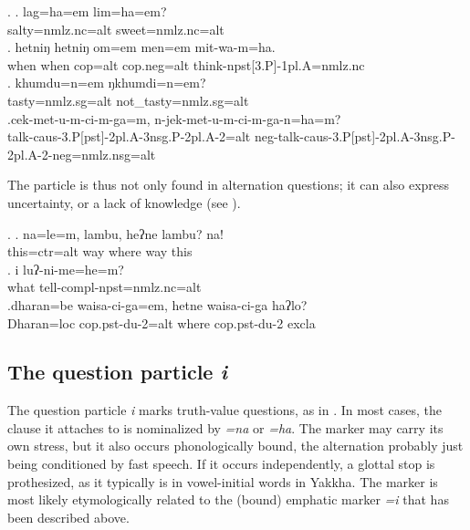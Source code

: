 \ex. \ag. lag=ha=em lim=ha=em?\\
salty{\sc =nmlz.nc=alt} sweet{\sc =nmlz.nc=alt}\\
\bg. hetniŋ hetniŋ om=em men=em  mit-wa-m=ha.\\
when when	{\sc cop=alt} {\sc cop.neg=alt} think{\sc -npst[3.P]-1pl.A=nmlz.nc}\\
	\bg.   khumdu=n=em           ŋkhumdi=n=em?\\
tasty{\sc =nmlz.sg=alt} not\_tasty{\sc =nmlz.sg=alt}	\\
	 
	\bg.cek-met-u-m-ci-m-ga=m,                                    n-jek-met-u-m-ci-m-ga-n=ha=m?\\
talk{\sc -caus-3.P[pst]-2pl.A-3nsg.P-2pl.A-2=alt}	{\sc neg-}talk{\sc -caus-3.P[pst]-2pl.A-3nsg.P-2pl.A-2-neg=nmlz.nsg=alt}	\\
	 
 
 The  particle is thus not only found in alternation questions; it can also express uncertainty, or a lack of knowledge  (see \Next).
 
 \ex. \ag. na=le=m,              lambu, heʔne lambu? na!\\
 this{\sc =ctr=alt} way where way this\\
 \bg.  i    luʔ-ni-me=he=m?\\
 what tell{\sc -compl-npst=nmlz.nc=alt}\\
  
 \bg.dharan=be     waisa-ci-ga=em,             hetne  waisa-ci-ga           haʔlo?\\
 Dharan{\sc =loc} {\sc cop.pst-du-2=alt} where  {\sc cop.pst-du-2} {\sc excla}\\
  
 
 
\subsection{The question particle \emph{i}}\label{ptcl-q}

The question particle \emph{i} marks truth-value questions, as in \Next. In most cases, the clause it attaches to is nominalized by \emph{=na} or \emph{=ha}. The marker may carry its own stress, but it also occurs phonologically bound, the alternation probably just being conditioned by fast speech. If it occurs independently, a glottal stop is prothesized, as it typically is in vowel-initial words in Yakkha. The marker is most likely ety\-mo\-lo\-gi\-cally related to the (bound) emphatic  marker \emph{=i} that has been described above.

